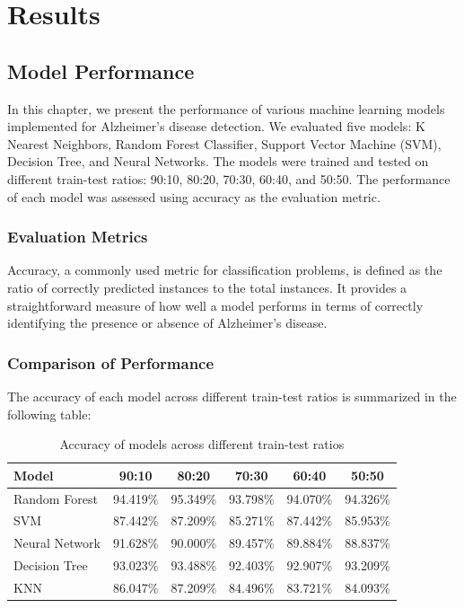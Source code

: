 \documentclass[a4paper,12pt]{report}
\begin{document}
\chapter{Results}

\section{Model Performance}

In this chapter, we present the performance of various machine learning models implemented for Alzheimer's disease detection. We evaluated five models: K Nearest Neighbors, Random Forest Classifier, Support Vector Machine (SVM), Decision Tree, and Neural Networks. The models were trained and tested on different train-test ratios: 90:10, 80:20, 70:30, 60:40, and 50:50. The performance of each model was assessed using accuracy as the evaluation metric.

\subsection{Evaluation Metrics}

Accuracy, a commonly used metric for classification problems, is defined as the ratio of correctly predicted instances to the total instances. It provides a straightforward measure of how well a model performs in terms of correctly identifying the presence or absence of Alzheimer's disease.

\subsection{Comparison of Performance}

The accuracy of each model across different train-test ratios is summarized in the following table:

\begin{table}[h!]
\centering
\begin{tabular}{|l|c|c|c|c|c|}
\hline
\textbf{Model} & \textbf{90:10} & \textbf{80:20} & \textbf{70:30} & \textbf{60:40} & \textbf{50:50} \\
\hline
Random Forest & 94.419\% & 95.349\% & 93.798\% & 94.070\% & 94.326\% \\
SVM & 87.442\% & 87.209\% & 85.271\% & 87.442\% & 85.953\% \\
Neural Network & 91.628\% & 90.000\% & 89.457\% & 89.884\% & 88.837\% \\
Decision Tree & 93.023\% & 93.488\% & 92.403\% & 92.907\% & 93.209\% \\
KNN & 86.047\% & 87.209\% & 84.496\% & 83.721\% & 84.093\% \\
\hline
\end{tabular}
\caption{Accuracy of models across different train-test ratios}
\end{table}
\end{document}
